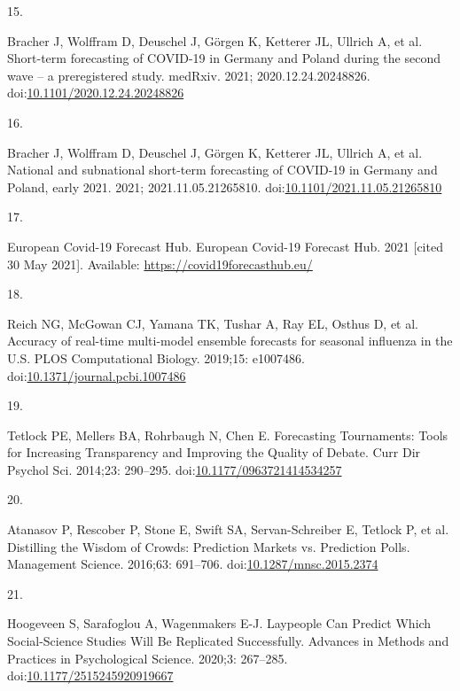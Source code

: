 \documentclass[10pt,letterpaper]{article}
\newlength{\cslhangindent}
\newlength{\csllabelwidth}
\newlength{\cslentryspacingunit} %
\newenvironment{CSLReferences}[2] %
 {%
  \setlength{\parindent}{0pt}
  \ifodd #1
  \let\oldpar\par
  \def\par{\hangindent=\cslhangindent\oldpar}
  \fi
  \setlength{\parskip}{#2\cslentryspacingunit}
 }%
 {}
\newcommand{\CSLLeftMargin}[1]{\parbox[t]{\csllabelwidth}{#1}}
\newcommand{\CSLRightInline}[1]{\parbox[t]{\linewidth - \csllabelwidth}{#1}\break}
\begin{document}
\begin{CSLReferences}{0}{0}
\leavevmode{}%
\CSLLeftMargin{15. }
\CSLRightInline{Bracher J, Wolffram D, Deuschel J, Görgen K, Ketterer
JL, Ullrich A, et al. Short-term forecasting of {COVID-19} in {Germany}
and {Poland} during the second wave -- a preregistered study. medRxiv.
2021; 2020.12.24.20248826.
doi:\href{https://doi.org/10.1101/2020.12.24.20248826}{10.1101/2020.12.24.20248826}}

\leavevmode{}%
\CSLLeftMargin{16. }
\CSLRightInline{Bracher J, Wolffram D, Deuschel J, Görgen K, Ketterer
JL, Ullrich A, et al. National and subnational short-term forecasting of
{COVID-19} in {Germany} and {Poland}, early 2021. 2021;
2021.11.05.21265810.
doi:\href{https://doi.org/10.1101/2021.11.05.21265810}{10.1101/2021.11.05.21265810}}

\leavevmode{}%
\CSLLeftMargin{17. }
\CSLRightInline{European Covid-19 Forecast Hub. European {Covid-19
Forecast Hub}. 2021 {[}cited 30 May 2021{]}. Available:
\url{https://covid19forecasthub.eu/}}

\leavevmode{}%
\CSLLeftMargin{18. }
\CSLRightInline{Reich NG, McGowan CJ, Yamana TK, Tushar A, Ray EL,
Osthus D, et al. Accuracy of real-time multi-model ensemble forecasts
for seasonal influenza in the {U}.{S}. PLOS Computational Biology.
2019;15: e1007486.
doi:\href{https://doi.org/10.1371/journal.pcbi.1007486}{10.1371/journal.pcbi.1007486}}

\leavevmode{}%
\CSLLeftMargin{19. }
\CSLRightInline{Tetlock PE, Mellers BA, Rohrbaugh N, Chen E. Forecasting
{Tournaments}: {Tools} for {Increasing Transparency} and {Improving} the
{Quality} of {Debate}. Curr Dir Psychol Sci. 2014;23: 290--295.
doi:\href{https://doi.org/10.1177/0963721414534257}{10.1177/0963721414534257}}

\leavevmode{}%
\CSLLeftMargin{20. }
\CSLRightInline{Atanasov P, Rescober P, Stone E, Swift SA,
Servan-Schreiber E, Tetlock P, et al. Distilling the {Wisdom} of
{Crowds}: {Prediction Markets} vs. {Prediction Polls}. Management
Science. 2016;63: 691--706.
doi:\href{https://doi.org/10.1287/mnsc.2015.2374}{10.1287/mnsc.2015.2374}}

\leavevmode{}%
\CSLLeftMargin{21. }
\CSLRightInline{Hoogeveen S, Sarafoglou A, Wagenmakers E-J. Laypeople
{Can Predict Which Social-Science Studies Will Be Replicated
Successfully}. Advances in Methods and Practices in Psychological
Science. 2020;3: 267--285.
doi:\href{https://doi.org/10.1177/2515245920919667}{10.1177/2515245920919667}}


\end{CSLReferences}
\end{document}
